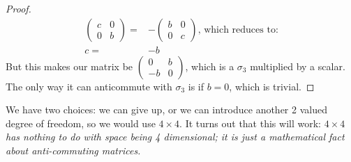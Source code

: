 \documentclass[]{article}
\begin{document}
\begin{proof}
\begin{align*}
\begin{pmatrix}
			c & 0\\
			0 & b
		\end{pmatrix} =& - \begin{pmatrix}
			b & 0\\
			0 & c
		\end{pmatrix} \text{, which reduces to:}\\
		c =& -b
	\end{align*}
	But this makes our matrix be $\begin{pmatrix}
		0 & b\\
		-b & 0
	\end{pmatrix}$, which is a $\sigma_3$ multiplied by a scalar. The only way it can anticommute with $\sigma_3$ is if $b=0$, which is trivial.
\end{proof}
We have two choices: we can give up, or we can introduce another 2 valued degree of freedom, so we would use $4 \times 4$. It turns out that this will work: $4 \times 4$ \emph{has nothing to do with space being 4 dimensional; it is just a mathematical fact about anti-commuting matrices.} 
\end{document}

